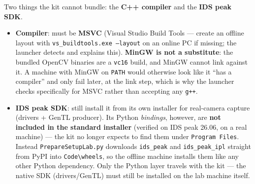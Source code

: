 \documentclass[11pt,a4paper]{article}
\begin{document}
Two things the kit cannot bundle: the \textbf{C++ compiler} and the
\textbf{IDS peak SDK}.
\begin{itemize}
  \item \textbf{Compiler}: must be \textbf{MSVC} (Visual Studio Build
        Tools --- create an offline layout with
        \texttt{vs\_buildtools.exe --layout} on an online PC if missing; the
        launcher detects and explains this). \textbf{MinGW is not a
        substitute}: the bundled OpenCV binaries are a \texttt{vc16} build,
        and MinGW cannot link against it. A machine with MinGW on
        \texttt{PATH} would otherwise look like it ``has a compiler'' and
        only fail later, at the link step, which is why the launcher checks
        specifically for MSVC rather than accepting any \texttt{g++}.
  \item \textbf{IDS peak SDK}: still install it from its own installer for
        real-camera capture (drivers + GenTL producer). Its Python
        \emph{bindings}, however, are \textbf{not included in the standard
        installer} (verified on IDS peak 26.06, on a real machine) --- the
        kit no longer expects to find them under \texttt{Program Files}.
        Instead \texttt{PrepareSetupLab.py} downloads \texttt{ids\_peak} and
        \texttt{ids\_peak\_ipl} straight from PyPI into
        \texttt{Code\textbackslash wheels}, so the offline machine installs
        them like any other Python dependency. Only the Python layer travels
        with the kit --- the native SDK (drivers/GenTL) must still be
        installed on the lab machine itself.
\end{itemize}
\end{document}
